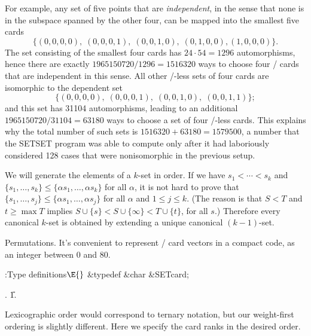 For example, any set of five points that are {\it independent}, in the
sense that none is in the subspace spanned by the other four, can be
mapped into the smallest five cards
$$\{(0,0,0,0),\;(0,0,0,1),\;(0,0,1,0),\;(0,1,0,0),(1,0,0,0)\}.$$
The set consisting of the smallest four cards has $24\cdot54=1296$
automorphisms, hence there are exactly $1965150720/1296=1516320$ ways to
choose four \SET/ cards that are independent in this sense.
All other \SET/-less sets of four cards are isomorphic to the dependent set
$$\{(0,0,0,0),\;(0,0,0,1),\;(0,0,1,0),\;(0,0,1,1)\};$$
and this set has 31104 automorphisms, leading to an additional
$1965150720/31104=63180$ ways to choose a set of four \SET/-less cards.
This explains why the total number of such sets is $1516320+63180=1579500$,
a number that the {\mc SETSET} program was able to compute only after
it had laboriously considered 128 cases that were nonisomorphic
in the previous setup.

\fi

We will generate the elements of a $k$-set in order. If
we have
$s_1<\cdots<s_k$ and $\{s_1,\ldots,s_k\}\le\{\alpha s_1,\ldots,\alpha s_k\}$
for all $\alpha$, it is not hard to prove that $\{s_1,\ldots,s_j\}\le\{\alpha
s_1,\ldots,\alpha s_j\}$ for all $\alpha$ and $1\le j\le k$.
(The reason is that $S<T$ and $t\ge\max T$ implies
$S\cup\{s\}<S\cup\{\infty\}<T\cup\{t\}$, for all $s$.)
Therefore every canonical $k$-set is obtained by extending a unique
canonical $(k-1)$-set.

\fi

Permutations.
It's convenient to represent \SET/ card vectors in a compact code,
as an integer between 0 and 80.

\Y\B\4:Type definitions\X${}\E{}$\6
\&{typedef} \&{char} \&{SETcard};\par
{}.
\U1.\fi

 Lexicographic order would correspond
to ternary notation, but our weight-first ordering is slightly different.
Here we specify the card ranks in the desired order.


